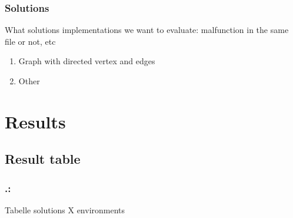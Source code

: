 \documentclass{beamer}
\begin{document}
\begin{frame}
	\frametitle{Solutions}
	What solutions implementations we want to evaluate:
	malfunction in the same file or not, etc 
	\begin{enumerate}
		\item{Graph with directed vertex and edges} 
		\item{Other} 
	\end{enumerate}
	
\end{frame}


\section{Results}

\subsection{Result table}
\begin{frame}
	\frametitle{\thesection.\thesubsection   \secname : \subsecname}
	Tabelle solutions X environments

\end{frame}
\end{document}
